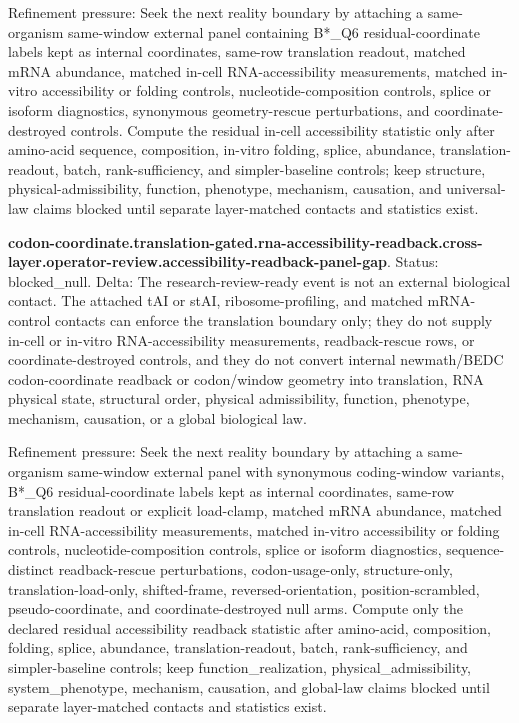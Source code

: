 Refinement pressure: Seek the next reality boundary by attaching a same-organism same-window external panel containing B*\_Q6 residual-coordinate labels kept as internal coordinates, same-row translation readout, matched mRNA abundance, matched in-cell RNA-accessibility measurements, matched in-vitro accessibility or folding controls, nucleotide-composition controls, splice or isoform diagnostics, synonymous geometry-rescue perturbations, and coordinate-destroyed controls. Compute the residual in-cell accessibility statistic only after amino-acid sequence, composition, in-vitro folding, splice, abundance, translation-readout, batch, rank-sufficiency, and simpler-baseline controls; keep structure, physical-admissibility, function, phenotype, mechanism, causation, and universal-law claims blocked until separate layer-matched contacts and statistics exist.

\textbf{codon-coordinate.translation-gated.rna-accessibility-readback.cross-layer.operator-review.accessibility-readback-panel-gap}. Status: blocked\_null. Delta: The research-review-ready event is not an external biological contact. The attached tAI or stAI, ribosome-profiling, and matched mRNA-control contacts can enforce the translation boundary only; they do not supply in-cell or in-vitro RNA-accessibility measurements, readback-rescue rows, or coordinate-destroyed controls, and they do not convert internal newmath/BEDC codon-coordinate readback or codon/window geometry into translation, RNA physical state, structural order, physical admissibility, function, phenotype, mechanism, causation, or a global biological law.

Refinement pressure: Seek the next reality boundary by attaching a same-organism same-window external panel with synonymous coding-window variants, B*\_Q6 residual-coordinate labels kept as internal coordinates, same-row translation readout or explicit load-clamp, matched mRNA abundance, matched in-cell RNA-accessibility measurements, matched in-vitro accessibility or folding controls, nucleotide-composition controls, splice or isoform diagnostics, sequence-distinct readback-rescue perturbations, codon-usage-only, structure-only, translation-load-only, shifted-frame, reversed-orientation, position-scrambled, pseudo-coordinate, and coordinate-destroyed null arms. Compute only the declared residual accessibility readback statistic after amino-acid, composition, folding, splice, abundance, translation-readout, batch, rank-sufficiency, and simpler-baseline controls; keep function\_realization, physical\_admissibility, system\_phenotype, mechanism, causation, and global-law claims blocked until separate layer-matched contacts and statistics exist.

